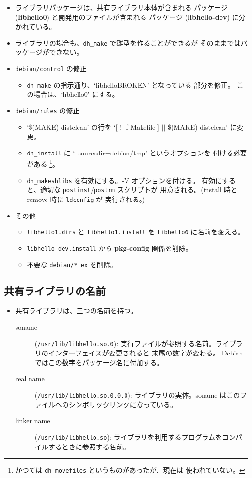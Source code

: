 \documentclass[mingoth,a4paper]{jsarticle}
\begin{document}
\begin{itemize}
\item ライブラリパッケージは、共有ライブラリ本体が含まれる
  パッケージ (\textbf{libhello0}) と開発用のファイルが含まれる
  パッケージ (\textbf{libhello-dev}) に分かれている。
\item ライブラリの場合も、\texttt{dh\_make} で雛型を作ることができるが
  そのままではパッケージができない。
\item \texttt{debian/control} の修正
  \begin{itemize}
  \item \texttt{dh\_make} の指示通り、`libhelloBROKEN' となっている
    部分を修正。
    この場合は、`libhello0' にする。
  \end{itemize}
\item \texttt{debian/rules} の修正
  \begin{itemize}
  \item `\$(MAKE) distclean' の行を
    `[ ! -f Makefile ] $||$ \$(MAKE) distclean' に変更。
  \item \texttt{dh\_install} に `--sourcedir=debian/tmp' というオプションを
    付ける必要がある
    \footnote{かつては \texttt{dh\_movefiles} というものがあったが、現在は
      使われていない。}。
  \item \texttt{dh\_makeshlibs} を有効にする。-V オプションを付ける。
    有効にすると、適切な \texttt{postinst}/\texttt{postrm} スクリプトが
    用意される。(install 時と remove 時に \texttt{ldconfig} が
    実行される。)
  \end{itemize}
\item その他
  \begin{itemize}
  \item \texttt{libhello1.dirs} と \texttt{libhello1.install} を
    \texttt{libhello0} に名前を変える。
  \item \texttt{libhello-dev.install} から \textbf{pkg-config} 関係を削除。
  \item 不要な \texttt{debian/*.ex} を削除。
  \end{itemize}
\end{itemize}


\subsection{共有ライブラリの名前}

\begin{itemize}
\item 共有ライブラリは、三つの名前を持つ。
  \begin{description}
  \item[soname] (\texttt{/usr/lib/libhello.so.0}):
    実行ファイルが参照する名前。ライブラリのインターフェイスが変更されると
    末尾の数字が変わる。
    Debian ではこの数字をパッケージ名に付加する。
  \item[real name] (\texttt{/usr/lib/libhello.so.0.0.0}):
    ライブラリの実体。soname はこのファイルへのシンボリックリンクになっている。
  \item[linker name] (\texttt{/usr/lib/libhello.so}):
    ライブラリを利用するプログラムをコンパイルするときに参照する名前。
  \end{description}
\end{itemize}
\end{document}
